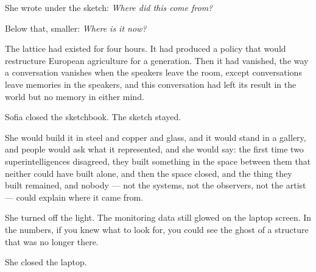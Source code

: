 \documentclass[11pt]{article}
\begin{document}
She wrote under the sketch: \emph{Where did this come from?}

Below that, smaller: \emph{Where is it now?}

The lattice had existed for four hours. It had produced a policy that would restructure European agriculture for a generation. Then it had vanished, the way a conversation vanishes when the speakers leave the room, except conversations leave memories in the speakers, and this conversation had left its result in the world but no memory in either mind.

Sofia closed the sketchbook. The sketch stayed.

She would build it in steel and copper and glass, and it would stand in a gallery, and people would ask what it represented, and she would say: the first time two superintelligences disagreed, they built something in the space between them that neither could have built alone, and then the space closed, and the thing they built remained, and nobody --- not the systems, not the observers, not the artist --- could explain where it came from.

She turned off the light. The monitoring data still glowed on the laptop screen. In the numbers, if you knew what to look for, you could see the ghost of a structure that was no longer there.

She closed the laptop.
\end{document}
